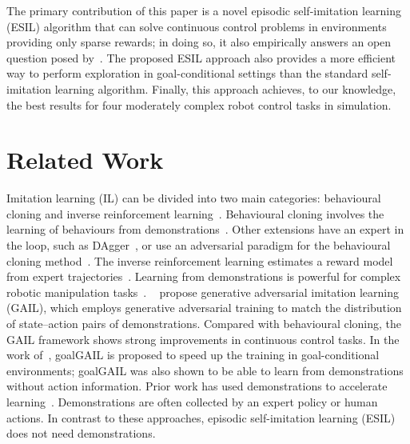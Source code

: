 The primary contribution of this paper is a novel episodic self-imitation learning (ESIL) algorithm that can solve continuous control problems {in environments providing only sparse rewards}; in doing so, it also empirically answers an open question posed by~\cite{plappert2018multi}. {The proposed ESIL approach also provides} a more efficient way to perform exploration in goal-conditional settings than the standard self-imitation learning algorithm. Finally, this approach achieves, to our knowledge, the best results for four moderately complex robot control tasks in simulation. 

\section{Related Work}
Imitation learning (IL) can be divided into two main categories: behavioural cloning and inverse reinforcement learning~\cite{hussein2017imitation}. Behavioural cloning involves the learning of behaviours from demonstrations~\cite{bojarski2016end,xu2017end,torabi2018behavioral}. Other extensions have an expert in the loop, such as DAgger~\cite{ross2011reduction}, or use an adversarial paradigm for the behavioural cloning method~\cite{ho2016generative,wang2017robust}. The inverse reinforcement learning estimates a reward model from expert trajectories~\cite{ng2000algorithms,abbeel2004apprenticeship,ziebart2008maximum}. Learning from demonstrations is powerful for complex robotic manipulation tasks~\cite{finn2016guided,zhang2018deep,pmlr-v78-finn17a,rajeswaran2017learning,fang2019survey}. ~\cite{ho2016generative} propose generative adversarial imitation learning (GAIL), which employs generative adversarial training to match the distribution of state--action pairs of demonstrations. Compared with behavioural cloning, the GAIL framework shows strong improvements in continuous control tasks. In the work of~\cite{ding2019goal}, goalGAIL is proposed to speed up the training in goal-conditional environments; goalGAIL was also shown to be able to learn from demonstrations without action information. Prior work has used demonstrations to accelerate  learning~\cite{rajeswaran2017learning,vevcerik2017leveraging,nair2018overcoming}. Demonstrations are often collected by an expert policy or human actions. In contrast to these approaches, {episodic self-imitation learning (ESIL) does not need demonstrations.}

